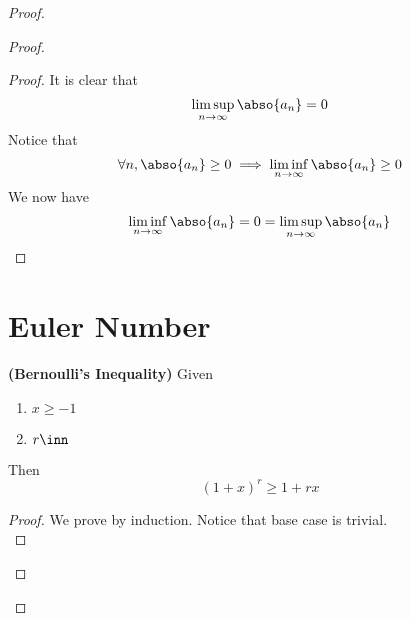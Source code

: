 \documentclass{report}
\begin{document}
\begin{proof}
\begin{proof}
\begin{proof}
It is clear that 
\begin{equation*}
\limsup_{n\to\infty} \abso{a_n}=0
\end{equation*}
Notice that  
\begin{equation*}
\forall n,\abso{a_n}\geq 0\implies \liminf_{n\to\infty} \abso{a_n}\geq 0
\end{equation*}
We now have 
\begin{equation*}
\liminf_{n\to\infty} \abso{a_n}=0=\limsup_{n\to\infty} \abso{a_n}
\end{equation*}
\end{proof}





\section{Euler Number}
\begin{lemma}
\label{4.5.1}
\textbf{(Bernoulli's Inequality)} Given 
\begin{enumerate}[label=(\alph*)]
  \item $x\geq -1$
  \item $r\inn$
\end{enumerate}
Then
\begin{equation*}
  (1+x)^r\geq 1+rx
\end{equation*}
\end{lemma}
\begin{proof}
We prove by induction. Notice that base case is trivial.\\


\end{proof}
\end{proof}
\end{proof}
\end{document}
